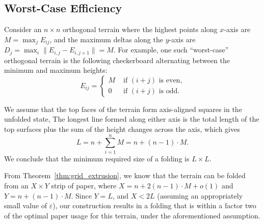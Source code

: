 \subsection{Worst-Case Efficiency}
\label{sec:optimality}

Consider an $n\times n$ orthogonal terrain where the highest points along $x$-axis are $M = \max_j E_{ij}$,
and the maximum deltas along the $y$-axis are $D_j = \max_i{\|E_{i,j}-E_{i,j+1}\|} = M$.
For example, one such ``worst-case'' orthogonal terrain is the following
checkerboard alternating between the minimum and maximum heights:
$$
E_{ij}=
\begin{cases}
M & \textrm{ if $(i+j)$ is even,}\\
0 & \textrm{ if $(i+j)$ is odd.}
\end{cases}
$$

We assume that the top faces of the terrain form axis-aligned squares in the unfolded state,
The longest line formed along either axis is the total length of the top surfaces plus the sum of the height changes across the axis, which gives
$$L = n + \sum^{n}_{i=1} M = n + (n-1)\cdot M.$$
We conclude that the minimum required size of a folding is $L\times L$.

From Theorem~\ref{thm:grid_extrusion}, we know that the terrain can be folded from an $X\times Y$ strip of paper,
where $X = n + 2(n-1)\cdot M + o(1)$ and $Y = n + (n-1)\cdot M$.
Since $Y = L$, and $X < 2L$ (assuming an appropriately small value of $\varepsilon$),
our construction results in a folding that is within a factor two of the optimal paper usage for this terrain, under the aforementioned assumption.




